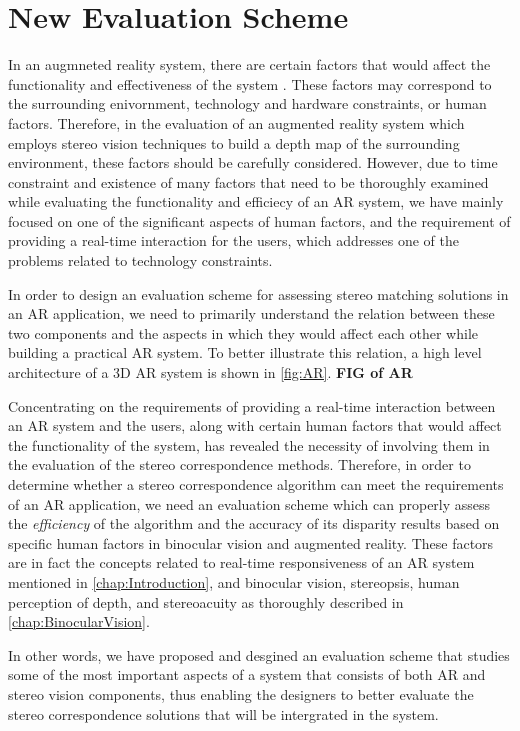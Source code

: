 \section{New Evaluation Scheme}

In an augmneted reality system, there are certain factors that would affect the functionality and effectiveness of the system \cite{dras96,liv05}. These factors may correspond to the surrounding 
enivornment, technology and hardware constraints, or human factors. Therefore, in the evaluation of an augmented reality system 
which employs stereo vision techniques to build a depth map of the surrounding environment, these factors should be carefully considered. 
However, due to time constraint and existence of many factors that need to be thoroughly 
examined while evaluating the functionality and efficiecy of an AR system, we have mainly focused on one of the significant aspects of human factors, 
and the requirement of providing a real-time interaction for
the users, which addresses one of the problems related to technology constraints. 

In order to design an evaluation scheme for assessing stereo matching solutions in an AR application, we need to primarily understand the relation between
these two components and the aspects in which they would affect each other while building a 
practical AR system. To better illustrate this relation, a high level architecture of a 3D AR system is shown in \ref{fig:AR}.
\textbf{FIG of AR}

Concentrating on the requirements of providing a real-time interaction between an AR system and the users, along with
certain human factors that would affect the functionality of the system,
has revealed the necessity of involving them in the evaluation of the stereo correspondence methods. Therefore, in order to 
determine whether a stereo correspondence algorithm can meet the requirements of an AR application, we need an evaluation scheme which can properly assess 
the \textit{efficiency} of the algorithm and the accuracy of its disparity results based on specific human factors in binocular vision and augmented reality.
These factors are in fact the concepts related to real-time responsiveness of an AR system mentioned in \ref{chap:Introduction}, and binocular vision, stereopsis, human perception of depth, 
and stereoacuity as thoroughly described in \ref{chap:BinocularVision}.

In other words, we have proposed and desgined an evaluation scheme that studies some of the most important aspects of a system that consists of both
AR and stereo vision components, thus enabling the designers to better evaluate the stereo correspondence solutions that will be intergrated 
in the system.

